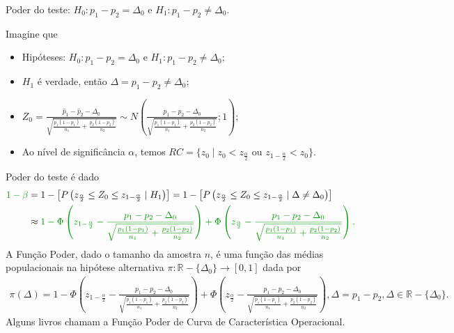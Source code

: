\documentclass[9pt]{beamer}
\begin{document}
\begin{frame}{Poder do teste: $H_0:p_1 - p_2 = \Delta_0$ e $H_1: p_1 - p_2 \neq \Delta_0$.}

\tiny

Imagine que
\begin{itemize}
	\item Hipóteses: $H_0: p_1 - p_2 = \Delta_0$ e $H_1: p_1 -  p_2 \neq \Delta_0$;
	\item $H_1$ é verdade, então $\Delta = p_1-p_2 \neq \Delta_0$;
	\item $Z_0 = \frac{\hat{p}_1 - \hat{p}_2 - \Delta_0}{\sqrt{ 
	\frac{p_1(1-p_1)}{n_1} + \frac{p_2(1-p_2)}{n_2} }} \sim N\left( \frac{p_1 - p_2 - \Delta_0}{\sqrt{\frac{p_1(1-p_1)}{n_1} + \frac{p_2(1-p_2)}{n_2}}};1 \right)$;
	\item Ao nível de significância $\alpha$, temos $RC = \{ z_0 \mid z_0 < z_{\frac{\alpha}{2}} \mbox{ ou } z_{1-\frac{\alpha}{2}} < z_0  \}$.
\end{itemize}
\vfill	

Poder do teste é dado
\begin{align*}
\textcolor{important}{1-\beta} &=1 - \left[P\left( z_{\frac{\alpha}{2}} \leq Z_0 \leq z_{1-\frac{\alpha}{2}} \mid H_1 \right)\right] = 1 - \left[P\left( z_{\frac{\alpha}{2}} \leq Z_0 \leq z_{1-\frac{\alpha}{2}} \mid \Delta \neq \Delta_0 \right)\right]\\
&\approx \textcolor{important}{1 - \Phi\left( z_{1-\frac{\alpha}{2}} - \frac{p_1-p_2 - \Delta_0}{\sqrt{\frac{p_1(1-p_1)}{n_1} + \frac{p_2(1-p_2)}{n_2}}} \right) + \Phi\left( z_{\frac{\alpha}{2}} - \frac{p_1-p_2 - \Delta_0}{\sqrt{\frac{p_1(1-p_1)}{n_1} + \frac{p_2(1-p_2)}{n_2}}} \right).}
\end{align*}
A \textcolor{important}{Função Poder}, dado o tamanho da amostra $n$, é uma função das médias populacionais na hipótese alternativa  $\pi: \mathbb{R} - \{\Delta_0\} \longrightarrow [0,1]$ dada por
\begin{align*}
\pi(\Delta) = 1 - \Phi\left( z_{1-\frac{\alpha}{2}} - \frac{p_1-p_2 - \Delta_0}{\sqrt{\frac{p_1(1-p_1)}{n_1} + \frac{p_2(1-p_2)}{n_2}}} \right) + \Phi\left( z_{\frac{\alpha}{2}} - \frac{p_1-p_2 - \Delta_0}{\sqrt{\frac{p_1(1-p_1)}{n_1} + \frac{p_2(1-p_2)}{n_2}}} \right), \Delta = p_1 - p_2, \Delta \in \mathbb{R} - \{\Delta_0 \}.
\end{align*}
Alguns livros chamam a Função Poder de \textcolor{important}{Curva de Característica Operacional.}

\normalsize

\end{frame}
\end{document}
